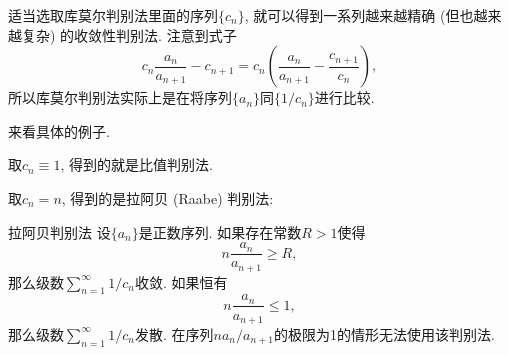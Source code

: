 适当选取库莫尔判别法里面的序列$\{c_n\}$, 就可以得到一系列越来越精确 (但也越来越复杂) 的收敛性判别法. 注意到式子
$$
c_n\frac{a_n}{a_{n+1}}-c_{n+1}=c_n\left(\frac{a_n}{a_{n+1}}-\frac{c_{n+1}}{c_n}\right),
$$
所以库莫尔判别法实际上是在将序列$\{a_n\}$同$\{1/c_n\}$进行比较.

来看具体的例子. 

取$c_n\equiv1$, 得到的就是比值判别法.

取$c_n=n$, 得到的是拉阿贝 (Raabe) 判别法:

\begin{theorem}{拉阿贝判别法}
设$\{a_n\}$是正数序列. 如果存在常数$R>1$使得
$$
n\frac{a_n}{a_{n+1}}\geq R,
$$
那么级数$\sum_{n=1}^\infty 1/c_n$收敛. 如果恒有
$$
n\frac{a_n}{a_{n+1}}\leq 1,
$$
那么级数$\sum_{n=1}^\infty 1/c_n$发散. 在序列$na_n/a_{n+1}$的极限为1的情形无法使用该判别法.
\end{theorem}